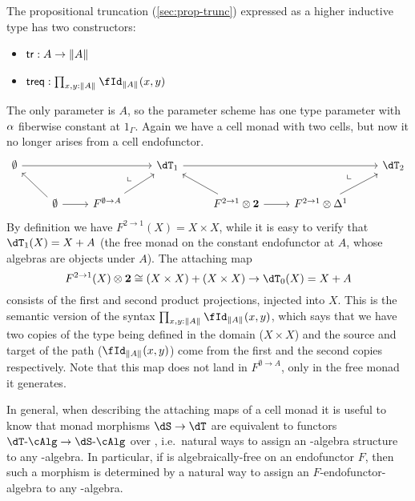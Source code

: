 \documentclass{amsart}
\def\alg{\text{-}\cAlg}
\def\tr{\mathsf{tr}}
\def\treq{\mathsf{treq}}
\begin{document}
\begin{eg} \label{eg:prop-trunc}
  The propositional truncation (\cref{sec:prop-trunc}) expressed as a higher inductive type has two constructors:
  \begin{itemize}
  \item $\tr:A \to\brck{A}$
  \item $\treq : \prod_{x,y:\brck A} \id[\brck A]{x}{y}$
  \end{itemize}
  The only parameter is $A$, so the parameter scheme has one type parameter with $\alpha$ fiberwise constant at $1_\Gamma$.
  Again we have a cell monad with two cells, but now it no longer arises from a cell endofunctor.
  \[
  \begin{tikzcd}
    \emptyset \ar[rrr] &&& \dT_1 \ar[rrr] &&& \dT_2 \\
    & \emptyset \ar[ul] \ar[r] \ar[urr,phantom,near end,"\llcorner"] & F^{\emptyset\to A} \ar[ur] &
    & F^{2\to 1} \otimes \mathbf{2} \ar[ul] \ar[r] \ar[urr,phantom,near end,"\llcorner"] & F^{2\to 1} \otimes \ivl \ar[ur]
  \end{tikzcd}
  \]
  By definition we have $F^{2\to 1}(X) = X\times X$, while it is easy to verify that $\dT_1(X) = X+A$ (the free monad on the constant endofunctor at $A$, whose algebras are objects under $A$).
  The attaching map
  \[F^{2\to 1}(X)\otimes \mathbf{2} \cong (X\times X) + (X\times X) \to \dT_0(X) = X+A\]
  consists of the first and second product projections, injected into $X$.
  This is the semantic version of the syntax $\prod_{x,y:\brck A} \id[\brck A]{x}{y}$, which says that we have two copies of the type being defined in the domain ($X\times X$) and the source and target of the path ($\id[\brck A]{x}{y}$) come from the first and the second copies respectively.
  Note that this map does not land in $F^{\emptyset\to A}$, only in the free monad it generates.
\end{eg}

In general, when describing the attaching maps of a cell monad it is useful to know that monad morphisms $\dS\to\dT$ are equivalent to functors $\dT\alg\to\dS\alg$ over \sM, i.e.\ natural ways to assign an \dS-algebra structure to any \dT-algebra.
In particular, if \dS is algebraically-free on an endofunctor $F$, then such a morphism is determined by a natural way to assign an $F$-endofunctor-algebra to any \dT-algebra.
\end{document}
